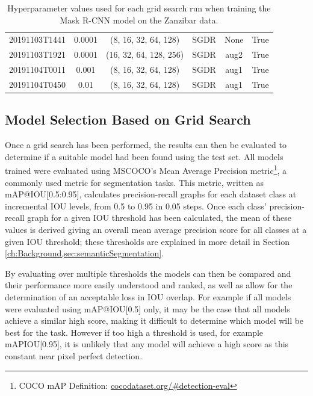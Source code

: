 \begin{table}[!ht]
\begin{adjustbox}{width=\columnwidth, center}
\begin{tabular}{cccccc}
			20191103T1441 &       0.0001 &     (8, 16, 32, 64, 128) &      SGDR &                  None &                  True \\
			20191103T1921 &       0.0001 &   (16, 32, 64, 128, 256) &      SGDR &                  aug2 &                  True \\
			20191104T0011 &        0.001 &     (8, 16, 32, 64, 128) &      SGDR &                  aug1 &                  True \\
			20191104T0450 &         0.01 &     (8, 16, 32, 64, 128) &      SGDR &                  aug1 &                  True \\
			\bottomrule
		\end{tabular}
	\end{adjustbox}
	\caption{Hyperparameter values used for each grid search run when training the Mask R-CNN model on the Zanzibar data.}\label{tab:MaskRCNNHyperparamTuningGridSearch}
\end{table}

\subsection{Model Selection Based on Grid Search}\label{ch:cetDet,sec:ModelSelection,sub:ModelSelectionBasedOnGridSearch}

Once a grid search has been performed, the results can then be evaluated to determine if a suitable model had been found using the test set. All models trained were evaluated using MSCOCO's Mean Average Precision metric\footnote{COCO mAP Definition: \href{https://cocodataset.org/\#detection-eval}{cocodataset.org/\#detection-eval}}, a commonly used metric for segmentation tasks. This metric, written as mAP@IOU[0.5:0.95], calculates precision-recall graphs for each dataset class at incremental IOU levels, from 0.5 to 0.95 in 0.05 steps. Once each class' precision-recall graph for a given IOU threshold has been calculated, the mean of these values is derived giving an overall mean average precision score for all classes at a given IOU threshold; these thresholds are explained in more detail in Section \ref{ch:Background,sec:semanticSegmentation}.

By evaluating over multiple thresholds the models can then be compared and their performance more easily understood and ranked, as well as allow for the determination of an acceptable loss in IOU overlap. For example if all models were evaluated using mAP@IOU[0.5] only, it may be the case that all models achieve a similar high score, making it difficult to determine which model will be best for the task. However if too high a threshold is used, for example mAPIOU[0.95], it is unlikely that any model will achieve a high score as this constant near pixel perfect detection. 

